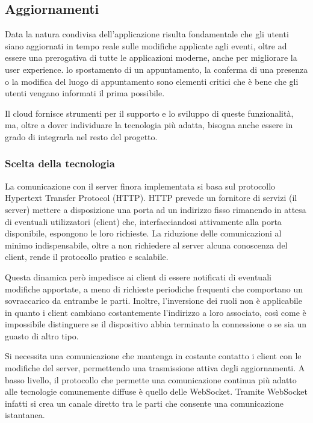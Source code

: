 \subsection{Aggiornamenti}

Data la natura condivisa dell’applicazione risulta fondamentale che gli utenti siano aggiornati in tempo reale sulle modifiche applicate agli eventi, oltre ad essere una prerogativa di tutte le applicazioni moderne, anche per migliorare la user experience. lo spostamento di un appuntamento, la conferma di una presenza o la modifica del luogo di appuntamento sono elementi critici che è bene che gli utenti vengano informati il prima possibile. 

Il cloud fornisce strumenti per il supporto e lo sviluppo di queste funzionalità, ma, oltre a dover individuare la tecnologia più adatta, bisogna anche essere in grado di integrarla nel resto del progetto.

\subsubsection{ Scelta della tecnologia}


La comunicazione con il server finora implementata si basa sul protocollo Hypertext Transfer Protocol (HTTP). HTTP prevede un fornitore di servizi (il server) mettere a disposizione una porta ad un indirizzo fisso rimanendo in attesa di eventuali utilizzatori (client) che, interfacciandosi attivamente alla porta disponibile,  espongono le loro richieste.
La riduzione delle comunicazioni al minimo indispensabile, oltre a non richiedere al server alcuna conoscenza del client, rende il protocollo pratico e scalabile.

Questa dinamica però impedisce ai client di essere notificati di eventuali modifiche apportate, a meno di richieste periodiche frequenti che comportano un sovraccarico da entrambe le parti. Inoltre, l’inversione dei ruoli non è applicabile in quanto i client cambiano costantemente l’indirizzo a loro associato, così come è impossibile distinguere se il dispositivo abbia terminato la connessione o se sia un guasto di altro tipo. 

Si necessita una comunicazione che mantenga in costante contatto i client con le modifiche del server, permettendo una trasmissione attiva degli aggiornamenti.
A basso livello, il protocollo che permette una comunicazione continua più adatto alle tecnologie comunemente diffuse è quello delle WebSocket. Tramite WebSocket infatti si crea un canale diretto tra le parti che consente una comunicazione istantanea. 

